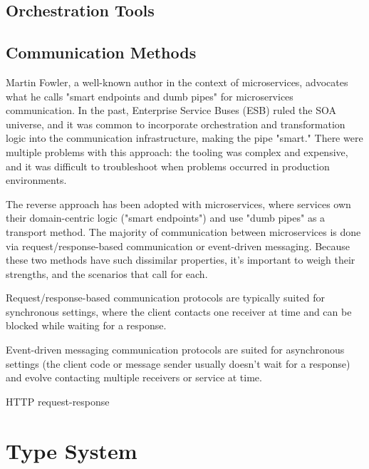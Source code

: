 \subsection{Orchestration Tools} %
\label{sec:orchestration_tools}

\subsection{Communication Methods} %
\label{sec:communication_methods}

Martin Fowler, a well-known author in the context of microservices, advocates what he calls "smart endpoints and dumb pipes" for microservices communication.
In the past, Enterprise Service Buses (ESB) ruled the SOA universe,
and it was common to incorporate orchestration and transformation logic into the communication infrastructure,
making the pipe "smart." There were multiple problems with this approach:
the tooling was complex and expensive, and it was difficult to troubleshoot when problems occurred in production environments.

The reverse approach has been adopted with microservices,
where services own their domain-centric logic ("smart endpoints") and use "dumb pipes" as a transport method.
The majority of communication between microservices is done via request/response-based communication or event-driven messaging.
Because these two methods have such dissimilar properties, it's important to weigh their strengths, and the scenarios that call for each.

Request/response-based communication protocols are typically suited for synchronous settings, where the client contacts one receiver at time and can be blocked while waiting for a response.

Event-driven messaging communication protocols are suited for asynchronous settings (the client code or message sender usually doesn't wait for a response) and evolve
contacting multiple receivers or service at time.

HTTP request-response

\section{Type System} %
\label{sec:type_system}
